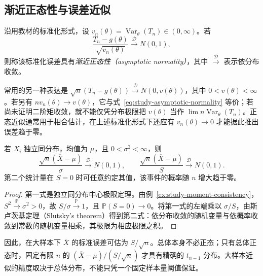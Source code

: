 \subsection{渐近正态性与误差近似}

\begin{definition}[标准化误差的渐近正态性]
\label{def:study-asymptotic-normality}
沿用教材的标准化形式，设 $v_n(\theta)=\operatorname{Var}_\theta(T_n)\in(0,\infty)$。若
\begin{equation}
  \frac{T_n-g(\theta)}{\sqrt{v_n(\theta)}}
      \xrightarrow{\mathcal D}N(0,1),
  \label{eq:study-asymptotic-normality}
\end{equation}
则称该标准化误差具有\emph{渐近正态性（asymptotic normality）}，其中 $\xrightarrow{\mathcal D}$ 表示依分布收敛。
\end{definition}

常用的另一种表达是 $\sqrt n(T_n-g(\theta))\xrightarrow{\mathcal D}N(0,v(\theta))$，其中 $0<v(\theta)<\infty$。若另有 $nv_n(\theta)\to v(\theta)$，它与式~\eqref{eq:study-asymptotic-normality} 等价；若尚未证明二阶矩收敛，就不能仅凭分布极限把 $v(\theta)$ 当作 $\lim n\operatorname{Var}_\theta(T_n)$。正态近似通常用于相合估计，在上述标准化形式下还应有 $v_n(\theta)\to0$ 才能据此推出误差趋于零。

\begin{theorem}[样本均值及其可行标准化]
\label{thm:study-studentized-mean-limit}
若 $X_i$ 独立同分布，均值为 $\mu$，且 $0<\sigma^2<\infty$，则
\begin{equation}
  \frac{\sqrt n(\overline X-\mu)}{\sigma}
       \xrightarrow{\mathcal D}N(0,1),\qquad
  \frac{\sqrt n(\overline X-\mu)}{S}
       \xrightarrow{\mathcal D}N(0,1).
  \label{eq:study-studentized-mean-limit}
\end{equation}
第二个统计量在 $S=0$ 时可任意约定其值，该事件的概率随 $n$ 增大趋于零。
\end{theorem}

\begin{proof}
第一式是独立同分布中心极限定理。由例~\ref{ex:study-moment-consistency}，$S^2\xrightarrow{\mathbb P}\sigma^2>0$，故 $S/\sigma\xrightarrow{\mathbb P}1$，且 $\mathbb P(S=0)\to0$。将第一式的左端乘以 $\sigma/S$，由斯卢茨基定理（Slutsky's theorem）得到第二式：依分布收敛的随机变量与依概率收敛到常数的随机变量相乘，其极限为相应极限之积。
\end{proof}

因此，在大样本下 $\overline X$ 的标准误差可估为 $S/\sqrt n$。总体本身不必正态；只有总体正态时，固定有限 $n$ 的 $(\overline X-\mu)/(S/\sqrt n)$ 才具有精确的 $t_{n-1}$ 分布。大样本近似的精度取决于总体分布，不能只凭一个固定样本量阈值保证。

